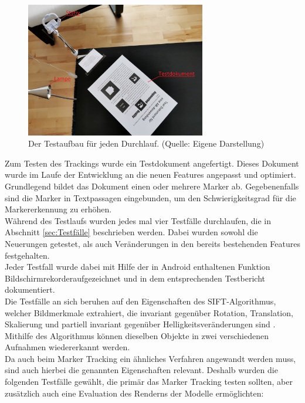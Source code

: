 \begin{figure}[h!]
\centering
\includegraphics[width=0.7\textwidth]{Abbildungen/Testaufbau.jpeg}
\caption[Testaufbau]{Der Testaufbau für jeden Durchlauf. (Quelle: Eigene Darstellung)}
\label{fig:Testaufbau}
\end{figure}
Zum Testen des Trackings wurde ein Testdokument  angefertigt. Dieses Dokument wurde im Laufe der Entwicklung an die neuen Features angepasst und optimiert. Grundlegend bildet das Dokument einen oder mehrere Marker ab. Gegebenenfalls sind die Marker in Textpassagen eingebunden, um den Schwierigkeitsgrad für die Markererkennung zu erhöhen.\\
Während des Testlaufs wurden jedes mal vier Testfälle durchlaufen, die in Abschnitt \ref{sec:Testfälle} beschrieben werden. Dabei wurden sowohl die Neuerungen getestet, als auch Veränderungen in den bereits bestehenden Features festgehalten.\\
Jeder Testfall wurde dabei mit Hilfe der in Android enthaltenen Funktion \glqq Bildschirmrekorder\grqq aufgezeichnet und in dem entsprechenden Testbericht dokumentiert.\\
Die Testfälle an sich beruhen auf den Eigenschaften des SIFT-Algorithmus, welcher Bildmerkmale extrahiert, die invariant gegenüber Rotation, Translation, Skalierung und partiell invariant gegenüber Helligkeitsveränderungen sind \citep[S. 345]{nischwitz:bildverarbeitung}. Mithilfe des Algorithmus können dieselben Objekte in zwei verschiedenen Aufnahmen wiedererkannt werden.\\
Da auch beim Marker Tracking ein ähnliches Verfahren angewandt werden muss, sind auch hierbei die genannten Eigenschaften relevant. Deshalb wurden die folgenden Testfälle gewählt, die primär das Marker Tracking testen sollten, aber zusätzlich auch eine Evaluation des Renderns der Modelle ermöglichten:

